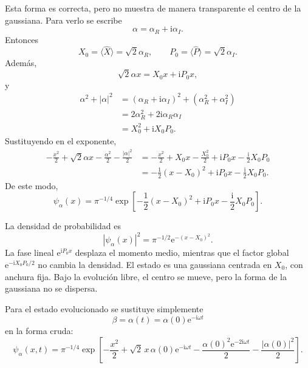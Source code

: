 \documentclass[11pt]{article}
\newcommand{\ii}{\mathrm{i}}
\newcommand{\ee}{\mathrm{e}}
\begin{document}
Esta forma es correcta, pero no muestra de manera transparente el centro de la
gaussiana. Para verlo se escribe
\begin{equation}
  \alpha=\alpha_R+\ii\alpha_I.
\end{equation}
Entonces
\begin{equation}
  X_0=\langle\hat X\rangle=\sqrt2\alpha_R,
  \qquad
  P_0=\langle\hat P\rangle=\sqrt2\alpha_I.
\end{equation}
Adem\'as,
\begin{equation}
  \sqrt2\alpha x=X_0x+\ii P_0x,
\end{equation}
y
\begin{align}
  \alpha^2+|\alpha|^2
  &=(\alpha_R+\ii\alpha_I)^2+(\alpha_R^2+\alpha_I^2)\\
  &=2\alpha_R^2+2\ii\alpha_R\alpha_I\\
  &=X_0^2+\ii X_0P_0.
\end{align}
Sustituyendo en el exponente,
\begin{align}
  -\frac{x^2}{2}
  +\sqrt2\alpha x
  -\frac{\alpha^2}{2}
  -\frac{|\alpha|^2}{2}
  &=
  -\frac{x^2}{2}+X_0x-\frac{X_0^2}{2}
  +\ii P_0x-\frac{\ii}{2}X_0P_0\\
  &=
  -\frac12(x-X_0)^2
  +\ii P_0x-\frac{\ii}{2}X_0P_0.
\end{align}
De este modo,
\begin{equation}
  \boxed{
  \psi_\alpha(x)
  =
  \pi^{-1/4}
  \exp\left[
  -\frac12(x-X_0)^2
  +\ii P_0x
  -\frac{\ii}{2}X_0P_0
  \right].
  }
\end{equation}

La densidad de probabilidad es
\begin{equation}
  |\psi_\alpha(x)|^2
  =\pi^{-1/2}\ee^{-(x-X_0)^2}.
\end{equation}
La fase lineal $\ee^{\ii P_0x}$ desplaza el momento medio, mientras que el
factor global $\ee^{-\ii X_0P_0/2}$ no cambia la densidad. El estado es una
gaussiana centrada en $X_0$, con anchura fija. Bajo la evoluci\'on libre, el
centro se mueve, pero la forma de la gaussiana no se dispersa.

Para el estado evolucionado se sustituye simplemente
\begin{equation}
  \beta=\alpha(t)=\alpha(0)\ee^{-\ii\omega t}
\end{equation}
en la forma cruda:
\begin{equation}
  \boxed{
  \psi_\alpha(x,t)
  =
  \pi^{-1/4}
  \exp\left[
  -\frac{x^2}{2}
  +\sqrt2\,x\,\alpha(0)\ee^{-\ii\omega t}
  -\frac{\alpha(0)^2\ee^{-2\ii\omega t}}{2}
  -\frac{|\alpha(0)|^2}{2}
  \right].
  }
\end{equation}
\end{document}
